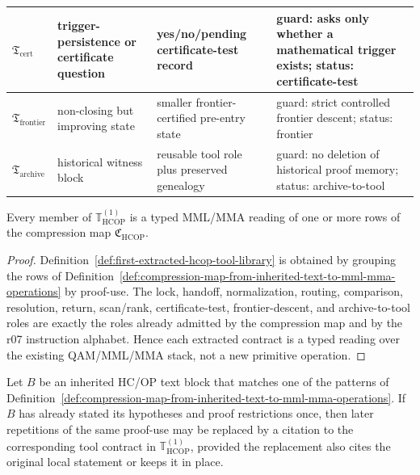 \begin{definition}
{\begin{longtable}{|p{}|p{}|p{}|p{}|}
\hline
\(\mathfrak T_{\mathrm{cert}}\) & trigger-persistence or certificate question & yes/no/pending certificate-test record & guard: asks only whether a mathematical trigger exists; status: certificate-test \\
\hline
\(\mathfrak T_{\mathrm{frontier}}\) & non-closing but improving state & smaller frontier-certified pre-entry state & guard: strict controlled frontier descent; status: frontier \\
\hline
\(\mathfrak T_{\mathrm{archive}}\) & historical witness block & reusable tool role plus preserved genealogy & guard: no deletion of historical proof memory; status: archive-to-tool \\
\hline
\end{longtable}
}
\end{definition}

\begin{lemma}
\label{lem:extracted-tool-contracts-are-typed-mml-mma-readings}
Every member of \(\mathbb T_{\mathrm{HCOP}}^{(1)}\) is a typed MML/MMA reading of one or more rows of the compression map \(\mathfrak C_{\mathrm{HCOP}}\).
\end{lemma}

\begin{proof}
Definition~\ref{def:first-extracted-hcop-tool-library} is obtained by grouping the rows of Definition~\ref{def:compression-map-from-inherited-text-to-mml-mma-operations} by proof-use. The lock, handoff, normalization, routing, comparison, resolution, return, scan/rank, certificate-test, frontier-descent, and archive-to-tool roles are exactly the roles already admitted by the compression map and by the r07 instruction alphabet. Hence each extracted contract is a typed reading over the existing QAM/MML/MMA stack, not a new primitive operation.
\end{proof}

\begin{proposition}
\label{prop:immediate-simplification-rule-for-inherited-hcop-prose}
Let \(B\) be an inherited HC/OP text block that matches one of the patterns of Definition~\ref{def:compression-map-from-inherited-text-to-mml-mma-operations}. If \(B\) has already stated its hypotheses and proof restrictions once, then later repetitions of the same proof-use may be replaced by a citation to the corresponding tool contract in \(\mathbb T_{\mathrm{HCOP}}^{(1)}\), provided the replacement also cites the original local statement or keeps it in place.
\end{proposition}

